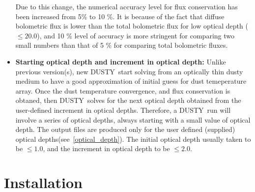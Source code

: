 \documentclass[11pt]{article}
\def\D  {{\sf DUSTY}}
\begin{document}
\begin{itemize}
Due to this change, the numerical accuracy level for flux conservation has
been increased from 5\% to 10 \%. It is because of the fact that diffuse
bolometric flux is lower than the total bolometric flux for low optical
depth ($\le 20.0$), and 10 \% level of accuracy is more stringent for
comparing two small numbers than that of 5 \% for comparing total
bolometric fluxes.
%
\item {\bf Starting optical depth and increment in optical depth:} Unlike
    previous version(s), new \D\ start solving from an optically thin dusty
    medium to have a good approximation of initial guess for dust
    temeperature array. Once the dust temperature convergence, and flux
    conservation is obtaned, then \D\ solves for the next optical depth
    obtained from the user-defined increment in optical depths. Therefore,
    a \D\ run will involve a series of optical depths, always starting with
    a small value of optical depth. The output files are produced only for
    the user defined (supplied) optical depths(see~\ref{optical_depth}).
    The initial optical depth usually taken to be $\le 1.0$, and the
    increment in optical depth to be $\le 2.0$.
\end{itemize}


\section{Installation}
\label{installation}
\end{document}
